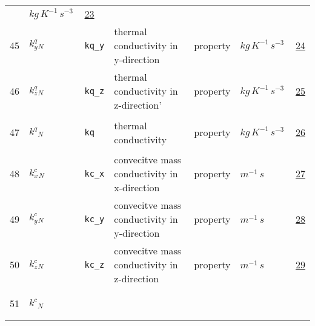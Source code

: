 \begin{longtable}{|p{1cm}|p{2.5cm}|p{4.5cm}|p{8cm}|p{3.0cm}|p{3cm}|p{1cm}|}
             & $ kg \,K^{-1} \,s^{-3} \, $
             & \hyperlink{"e:23"}{ 23 }
                 \\
    45
             & \hypertarget{"v:45"}{ $ {{k^q_y}}{_{N}} $}
             & \verb|kq_y|
             & thermal conductivity in y-direction
             & \begin{lay}property \end{lay}
             & $ kg \,K^{-1} \,s^{-3} \, $
             & \hyperlink{"e:24"}{ 24 }
                 \\
    46
             & \hypertarget{"v:46"}{ $ {{k^q_z}}{_{N}} $}
             & \verb|kq_z|
             & thermal conductivity in z-direction'
             & \begin{lay}property \end{lay}
             & $ kg \,K^{-1} \,s^{-3} \, $
             & \hyperlink{"e:25"}{ 25 }
                 \\
    47
             & \hypertarget{"v:47"}{ $ {{k^q}}{_{N}} $}
             & \verb|kq|
             & thermal conductivity
             & \begin{lay}property \end{lay}
             & $ kg \,K^{-1} \,s^{-3} \, $
             & \hyperlink{"e:26"}{ 26 }
                 \\
    48
             & \hypertarget{"v:48"}{ $ {{k^c_x}}{_{N}} $}
             & \verb|kc_x|
             & convecitve mass conductivity in x-direction
             & \begin{lay}property \end{lay}
             & $ m^{-1} \,s \, $
             & \hyperlink{"e:27"}{ 27 }
                 \\
    49
             & \hypertarget{"v:49"}{ $ {{k^c_y}}{_{N}} $}
             & \verb|kc_y|
             & convecitve mass conductivity in y-direction
             & \begin{lay}property \end{lay}
             & $ m^{-1} \,s \, $
             & \hyperlink{"e:28"}{ 28 }
                 \\
    50
             & \hypertarget{"v:50"}{ $ {{k^c_z}}{_{N}} $}
             & \verb|kc_z|
             & convecitve mass conductivity in z-direction
             & \begin{lay}property \end{lay}
             & $ m^{-1} \,s \, $
             & \hyperlink{"e:29"}{ 29 }
                 \\
    51
             & \hypertarget{"v:51"}{ $ {{k^c}}{_{N}} $}

\end{longtable}
